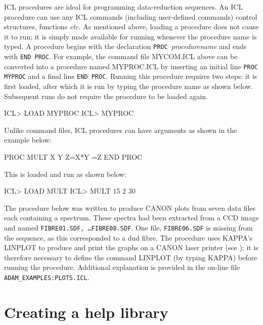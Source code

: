 \documentclass[twoside,11pt,nolof]{starlink}
\begin{document}
ICL procedures are ideal for programming data-reduction sequences.
An ICL procedure can use any ICL commands (including user-defined commands)
control structures, functions \textit{etc.}
As mentioned above, loading a procedure does not
cause it to run; it is simply made available for running whenever the
procedure name is typed.
A procedure begins with the declaration \texttt{PROC}~{\sl procedurename}
and ends with \texttt{END PROC}.
For example, the command file MYCOM.ICL above can be converted into a
procedure named MYPROC.ICL by inserting an initial line
\verb+PROC MYPROC+ and a final line \verb+END PROC+.
Running this procedure requires two steps: it is  first loaded, after which
it is
run by typing the procedure name
as shown below.
Subsequent runs do not require the procedure to be loaded again.
\begin{terminalv}
ICL> LOAD MYPROC
ICL> MYPROC
\end{terminalv}
Unlike command files, ICL procedures can have arguments as shown in the
example below:
\begin{terminalv}
PROC MULT X Y
  Z=X*Y
  =Z
END PROC
\end{terminalv}
This is loaded and run as shown below:
\begin{terminalv}
ICL> LOAD MULT
ICL> MULT 15 2
   30
\end{terminalv}
The procedure below was written to produce CANON plots from seven
data files each containing a spectrum.
These spectra had been extracted from a CCD image and named
\texttt{FIBRE01.SDF,  \ldots FIBRE08.SDF}. One file,
\texttt{FIBRE06.SDF}  is missing from the sequence, as this corresponded to
a dud fibre.
The procedure uses KAPPA's LINPLOT to produce and print
the graphs on a CANON laser printer (see ); it is
therefore necessary to define the command LINPLOT
(by typing KAPPA) before running the procedure. Additional explanation is
provided in the on-line file \texttt{ADAM\_EXAMPLES:PLOTS.ICL}.

\newpage
\section{Creating a help library\label{help}}
\end{document}
